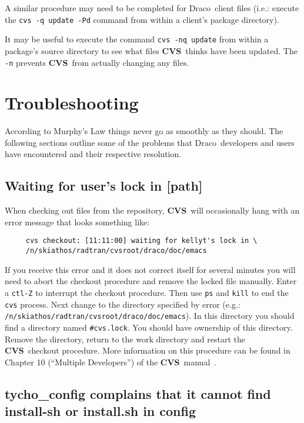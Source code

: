 \documentclass[11pt]{nmemo}
\newcommand{\comp}[1]{\normalfont\normalsize\texttt{#1}}
\newcommand{\draco}{{\normalfont\sffamily Draco}}
\newcommand{\cvs}{{\normalfont\bfseries CVS}}
\begin{document}
A similar procedure may need to be completed for \draco\ client files
(i.e.: execute the \comp{cvs -q update -Pd} command from within a
client's package directory).

It may be useful to execute the command \comp{cvs -nq update} from
within a package's source directory to see what files \cvs\ thinks
have been updated.  The \comp{-n} prevents \cvs\ from actually
changing any files.


\section{Troubleshooting}

According to Murphy's Law things never go as smoothly as they should.
The following sections outline some of the problems that \draco\ 
developers and users have encountered and their respective resolution.

\subsection{Waiting for user's lock in [path]}

When checking out files from the repository, \cvs\ will occasionally
hang with an error message that looks something like:
\begin{verbatim}
     cvs checkout: [11:11:00] waiting for kellyt's lock in \
     /n/skiathos/radtran/cvsroot/draco/doc/emacs
\end{verbatim}
If you receive this error and it does not correct itself for several
minutes you will need to abort the checkout procedure and remove the
locked file manually.  Enter a \comp{ctl-Z} to interrupt the checkout
procedure.  Then use \comp{ps} and \comp{kill} to end the \comp{cvs}
process.  Next change to the directory specified by error (e.g.:
\comp{/n/skiathos/radtran/cvsroot/draco/doc/emacs}).  In this
directory you should find a directory named \comp{\#cvs.lock}.  You
should have ownership of this directory.  Remove the directory, return
to the work directory and restart the \cvs\ checkout procedure.  More
information on this procedure can be found in Chapter 10 (``Multiple
Developers'') of the \cvs\ manual~\cite{cvs}.

\subsection{tycho\_config complains that it cannot find
  install-sh or install.sh in config}
\end{document}
